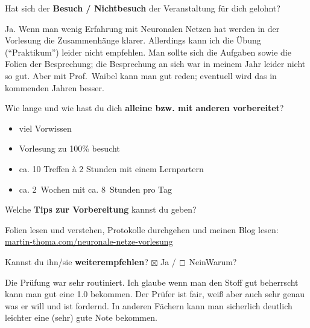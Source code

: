 \documentclass[a4paper]{article}
\begin{document}
 \begin{multicols}{2}

   Hat sich der \textbf{Besuch / Nichtbesuch} der Veranstaltung für dich gelohnt? \\
  \begin{minipage}[t][6.8cm]{\linewidth}
    Ja. Wenn man wenig Erfahrung mit Neuronalen Netzen hat werden in der
    Vorlesung die Zusammenhänge klarer. Allerdings kann ich die Übung
    (\enquote{Praktikum}) leider nicht empfehlen. Man sollte sich die Aufgaben
    sowie die Folien der Besprechung; die Besprechung an sich war in meinem
    Jahr leider nicht so gut. Aber mit Prof.~Waibel kann man gut reden;
    eventuell wird das in kommenden Jahren besser.
  \end{minipage}

   Wie lange und wie hast du dich \textbf{alleine bzw. mit anderen vorbereitet}? \\
  \begin{minipage}[t][7cm]{\linewidth}
    \begin{itemize}
        \item viel Vorwissen
        \item Vorlesung zu 100\% besucht
        \item ca. 10 Treffen à 2 Stunden mit einem Lernpartern
        \item ca. 2~Wochen mit ca. 8~Stunden pro Tag
    \end{itemize}
  \end{minipage}

   Welche \textbf{Tips zur Vorbereitung} kannst du geben?
  \\
  \begin{minipage}[t][7cm]{\linewidth}
    Folien lesen und verstehen, Protokolle durchgehen und
    meinen Blog lesen:\\
    \href{https://martin-thoma.com/neuronale-netze-vorlesung}{martin-thoma.com/neuronale-netze-vorlesung}
  \end{minipage}

\columnbreak

   Kannst du ihn/sie \textbf{weiterempfehlen}?
  $\boxtimes$ Ja / $\boxempty$ Nein\newline Warum? \\
  \begin{minipage}[t][6.8cm]{\linewidth}
    Die Prüfung war sehr routiniert. Ich glaube wenn man den Stoff gut
    beherrscht kann man gut eine 1.0 bekommen. Der Prüfer ist fair, weiß aber
    auch sehr genau was er will und ist fordernd. In anderen Fächern kann man
    sicherlich deutlich leichter eine (sehr) gute Note bekommen.
  \end{minipage}


\end{multicols}
\end{document}
